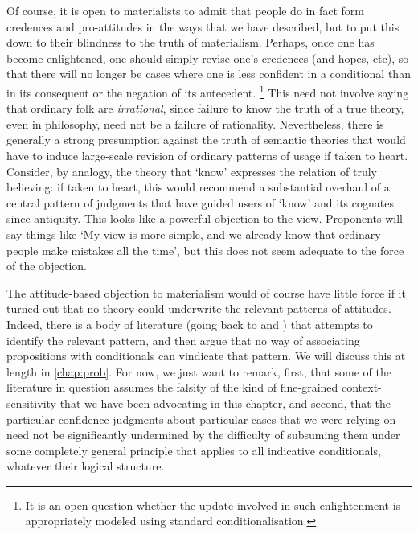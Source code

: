 \documentclass[If.tex]{subfiles}
\begin{document}
Of course, it is open to materialists to admit that people do in fact form credences and pro-attitudes in the ways that we have described, but to put this down to their blindness to the truth of materialism.  Perhaps, once one has become enlightened, one should simply revise one's credences (and hopes, etc), so that there will no longer be cases where one is less confident in a conditional than in its consequent or the negation of its antecedent.%
\footnote{It is an open question whether the update involved in such enlightenment is appropriately modeled using standard conditionalisation.}  
This need not involve saying that ordinary folk are \emph{irrational}, since failure to know the truth of a true theory, even in philosophy, need not be a failure of rationality.  Nevertheless, there is generally a strong presumption against the truth of semantic theories that would have to induce large-scale revision of ordinary patterns of usage if taken to heart.  Consider, by analogy, the theory that ‘know’ expresses the relation of truly believing: if taken to heart, this would recommend a substantial overhaul of a central pattern of judgments that have guided users of ‘know’ and its cognates since antiquity.  This looks like a powerful objection to the view.  Proponents will say things like ‘My view is more simple, and we already know that ordinary people make mistakes all the time’, but this does not seem adequate to the force of the objection.

The attitude-based objection to materialism would of course have little force if it turned out that no theory could underwrite the relevant patterns of attitudes. Indeed, there is a body of literature (going back to \cite{LewisPCCP} and \cite{StalnakerLVF}) that attempts to identify the relevant pattern, and then argue that no way of associating propositions with conditionals can vindicate that pattern.  We will discuss this at length in \autoref{chap:prob}.  For now, we just want to remark, first, that some of the literature in question assumes the falsity of the kind of fine-grained context-sensitivity that we have been advocating in this chapter, and second, that the particular confidence-judgments about particular cases that we were relying on need not be significantly undermined by the difficulty of subsuming them under some completely general principle that applies to all indicative conditionals, whatever their logical structure.  


\end{document}
